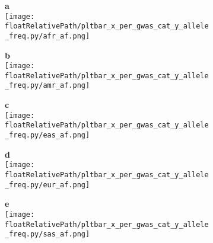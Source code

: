 \begin{figure}[!tbp]

\begin{subfigure}[]{.32\textwidth}
\textbf{a}
\\
\texttt{[image: \\floatRelativePath/pltbar\_x\_per\_gwas\_cat\_y\_allele\_freq.py/afr\_af.png]}
\end{subfigure}
%
\begin{subfigure}[]{.32\textwidth}
\textbf{b}
\\
\texttt{[image: \\floatRelativePath/pltbar\_x\_per\_gwas\_cat\_y\_allele\_freq.py/amr\_af.png]}
\end{subfigure}
%
\begin{subfigure}[]{.32\textwidth}
\textbf{c}
\\
\texttt{[image: \\floatRelativePath/pltbar\_x\_per\_gwas\_cat\_y\_allele\_freq.py/eas\_af.png]}
\end{subfigure}

\begin{subfigure}[]{.32\textwidth}
\textbf{d}
\\
\texttt{[image: \\floatRelativePath/pltbar\_x\_per\_gwas\_cat\_y\_allele\_freq.py/eur\_af.png]}
\end{subfigure}
%
\begin{subfigure}[]{.32\textwidth}
\textbf{e}
\\
\texttt{[image: \\floatRelativePath/pltbar\_x\_per\_gwas\_cat\_y\_allele\_freq.py/sas\_af.png]}
\end{subfigure}

\end{figure}
